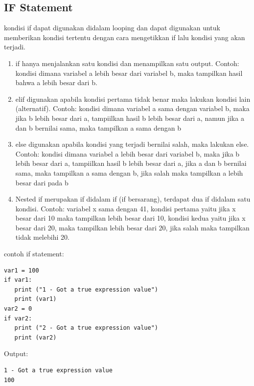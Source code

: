\subsection{IF Statement}
kondisi if dapat digunakan didalam looping dan dapat digunakan untuk memberikan kondisi tertentu dengan cara mengetikkan if lalu kondisi yang akan terjadi.\\
\begin{enumerate}
 \item if hanya menjalankan satu kondisi dan menampilkan satu output. Contoh: kondisi dimana variabel a lebih besar dari variabel b, maka tampilkan hasil bahwa a lebih besar dari b.

 \item elif digunakan apabila kondisi pertama tidak benar maka lakukan kondisi lain (alternatif). Contoh: kondisi dimana variabel a sama dengan variabel b, maka jika b lebih besar dari a, tampiilkan hasil b lebih besar dari a, namun jika a dan b bernilai sama, maka tampilkan a sama dengan b

\item else digunakan apabila kondisi yang terjadi bernilai salah, maka lakukan else. Contoh: kondisi dimana variabel a lebih besar dari variabel b, maka jika b lebih besar dari a, tampiilkan hasil b lebih besar dari a, jika a dan b bernilai sama, maka tampilkan a sama dengan b, jika salah maka tampilkan a lebih besar dari pada b

\item Nested if merupakan if didalam if (if bersarang), terdapat dua if didalam satu kondisi. Contoh: variabel x sama dengan 41, kondisi pertama yaitu jika x besar dari 10 maka tampilkan lebih besar dari 10, kondisi kedua yaitu jika x besar dari 20, maka tampilkan lebih besar dari 20, jika salah maka tampilkan tidak melebihi 20.

\end{enumerate}
contoh if statement:
\begin{verbatim}
var1 = 100
if var1:
   print ("1 - Got a true expression value")
   print (var1)
var2 = 0
if var2:
   print ("2 - Got a true expression value")
   print (var2)
\end{verbatim}
Output:
\begin{verbatim}
1 - Got a true expression value
100
\end{verbatim}


